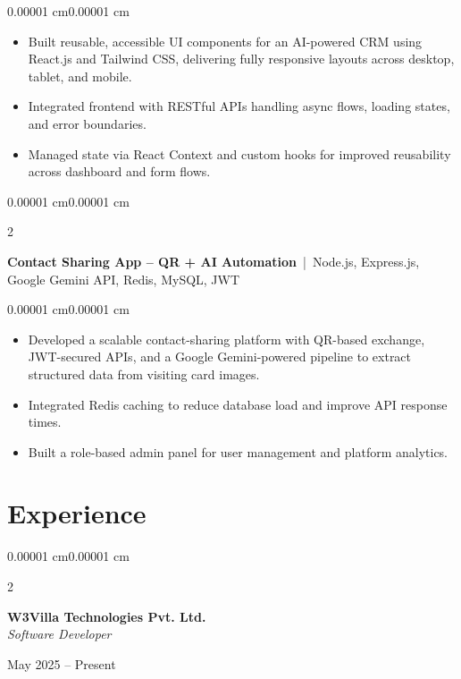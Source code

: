 \documentclass[10pt, letterpaper]{article}
\newenvironment{highlights}{
    \begin{itemize}[
        topsep=0.10 cm,
        parsep=0.10 cm,
        partopsep=0pt,
        itemsep=0.02 cm,
        leftmargin=15pt
    ]
}{
    \end{itemize}
}
\newenvironment{onecolentry}{
    \begin{adjustwidth}{0.00001 cm}{0.00001 cm}
}{
    \end{adjustwidth}
}
\newenvironment{twocolentry}[2][]{
    \onecolentry
    \def\secondColumn{#2}
    \setcolumnwidth{\fill, 4.5 cm}
    \begin{paracol}{2}
}{
    \switchcolumn \raggedleft \secondColumn
    \end{paracol}
    \endonecolentry
}
\begin{document}
\vspace{0.10cm}

\begin{onecolentry}
\begin{highlights}
\item Built reusable, accessible UI components for an AI-powered CRM using React.js and Tailwind CSS, delivering fully responsive layouts across desktop, tablet, and mobile.
\item Integrated frontend with RESTful APIs handling async flows, loading states, and error boundaries.
\item Managed state via React Context and custom hooks for improved reusability across dashboard and form flows.
\end{highlights}
\end{onecolentry}

\vspace{0.10cm}

\begin{twocolentry}{}
\textbf{Contact Sharing App -- QR + AI Automation} \,|\, Node.js, Express.js, Google Gemini API, Redis, MySQL, JWT
\end{twocolentry}

\vspace{0.10cm}

\begin{onecolentry}
\begin{highlights}
\item Developed a scalable contact-sharing platform with QR-based exchange, JWT-secured APIs, and a Google Gemini-powered pipeline to extract structured data from visiting card images.
\item Integrated Redis caching to reduce database load and improve API response times.
\item Built a role-based admin panel for user management and platform analytics.
\end{highlights}
\end{onecolentry}

\section{Experience}

\begin{twocolentry}{14 May 2025 -- Present}
\textbf{W3Villa Technologies Pvt. Ltd.}\\
\textit{Software Developer}
\end{twocolentry}
\end{document}
